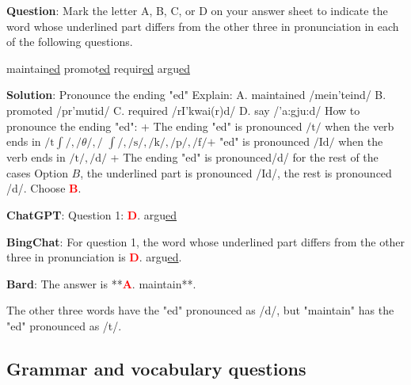 \documentclass[11pt]{article}
\begin{document}
\begin{mdframed}[linewidth=1pt,linecolor=red] \textbf{Question}: Mark the letter A, B, C, or D on your answer sheet to indicate the word whose underlined part differs from the other three in pronunciation in each of the following questions.
	\begin{choices}
		\choice maintain\underline{ed} 
		\choice promot\underline{ed} 
		\choice requir\underline{ed} 	
		\choice argu\underline{ed}
	\end{choices}
	
	\textbf{Solution}: 
	Pronounce the ending "ed"
	Explain:
	A. maintained /mein'teind/
	B. promoted /pr\textschwa'm\textschwa utid/
	C. required /rI'kwai\textschwa(r)d/
	D. say /'a:gju:d/
	How to pronounce the ending "ed":
	+ The ending "ed" is pronounced $/ \mathrm{t} /$ when the verb ends in $/ \mathrm{t} \int /, / \theta /, /$ $ \int /, / \mathrm{s} /, / \mathrm{k} /, / \mathrm{p} /, / \mathrm{f} / \mathrm{+}$ "ed" is pronounced $/ \mathrm{Id} /$ when the verb ends in $/ \mathrm{t} /, / \mathrm{d} /$
	+ The ending "ed" is pronounced/d/ for the rest of the cases Option $B$, the underlined part is pronounced /Id/, the rest is pronounced /d/.
	Choose \textcolor{red}{\textbf{B}}. 
	
	\textbf{ChatGPT}: Question 1: \textcolor{red}{\textbf{D}}. argu\underline{ed} 
	
	\textbf{BingChat}: For question 1, the word whose underlined part differs from the other three in pronunciation is \textcolor{red}{\textbf{D}}. argu\underline{ed}. 
	
	\textbf{Bard}: The answer is **\textcolor{red}{\textbf{A}}. maintain**.
	
	The other three words have the "ed" pronounced as /d/, but "maintain" has the "ed" pronounced as /t/.
		
\end{mdframed}

\subsection{Grammar and vocabulary questions}
\end{document}
